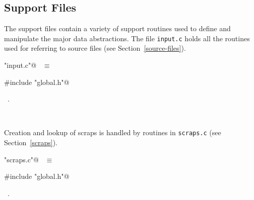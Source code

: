 \documentclass{report}
\begin{document}
\subsection{Support Files}

The support files contain a variety of support routines used to define
and manipulate the major data abstractions.
The file \verb|input.c| holds all the routines used for referring to
source files (see Section~\ref{source-files}).
\begin{flushleft} \small
\begin{minipage}{\linewidth} \label{scrap9}
\verb@"input.c"@\nobreak\ {\footnotesize {} }$\equiv$
\vspace{-1ex}
\begin{list}{}{} \item
\mbox{}\verb@#include "global.h"@\\
\mbox{}\verb@@{\NWsep}
\end{list}
\vspace{-1ex}
\footnotesize\addtolength{\baselineskip}{-1ex}
\begin{list}{}{\setlength{\itemsep}{-\parsep}\setlength{\itemindent}{-\leftmargin}}
\item \NWtxtFileDefBy\ .
\end{list}
\end{minipage}\\[4ex]
\end{flushleft}
Creation and lookup of scraps is handled by routines in \verb|scraps.c|
(see Section~\ref{scraps}).
\begin{flushleft} \small
\begin{minipage}{\linewidth} \label{scrap10}
\verb@"scraps.c"@\nobreak\ {\footnotesize {} }$\equiv$
\vspace{-1ex}
\begin{list}{}{} \item
\mbox{}\verb@#include "global.h"@\\
\mbox{}\verb@@{\NWsep}
\end{list}
\vspace{-1ex}
\footnotesize\addtolength{\baselineskip}{-1ex}
\begin{list}{}{\setlength{\itemsep}{-\parsep}\setlength{\itemindent}{-\leftmargin}}
\item \NWtxtFileDefBy\ .
\end{list}
\end{minipage}\\[4ex]
\end{flushleft}
\end{document}

